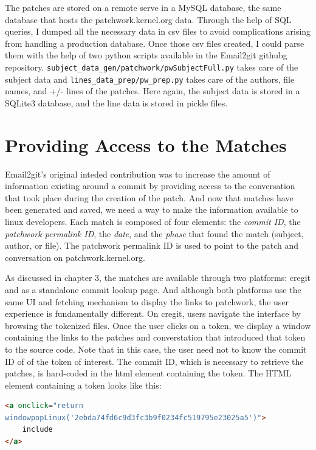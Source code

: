 The patches are stored on a remote serve in a MySQL database, the same database that hosts the patchwork.kernel.org data. Through the help of SQL queries, I dumped all the necessary data in csv files to avoid complications arising from handling a production database. Once those csv files created, I could parse them with the help of two python scripts available in the Email2git githubg repository. \texttt{subject\_data\_gen/patchwork/pwSubjectFull.py} takes care of the subject data and \texttt{lines\_data\_prep/pw\_prep.py} takes care of the authors, file names, and +/- lines of the patches. Here again, the subject data is stored in a SQLite3 database, and the line data is stored in pickle files. 







\section{Providing Access to the Matches}

Email2git's original inteded contribution was to increase the amount of information existing around a commit by providing access to the conversation that took place during the creation of the patch. And now that matches have been generated and saved, we need a way to make the information available to linux developers. Each match is composed of four elements: the \textit{commit ID}, the \textit{patchwork permalink ID}, the \textit{date}, and the \textit{phase} that found the match (subject, author, or file). The patchwork permalink ID is used to point to the patch and conversation on patchwork.kernel.org.

As discussed in chapter 3, the matches are available through two platforms: cregit and as a standalone commit lookup page. And although both platforms use the same UI and fetching mechanism to display the links to patchwork, the user experience is fundamentally different. On cregit, users navigate the interface by browsing the tokenized files. Once the user clicks on a token, we display a window containing the links to the patches and converstation that introduced that token to the source code. Note that in this case, the user need not to know the commit ID of of the token of interest. The commit ID, which is necessary to retrieve the patches, is hard-coded in the html element containing the token. The HTML element containing a token looks like this:

\begin{lstlisting}[language=HTML]
<a onclick="return 
windowpopLinux('2ebda74fd6c9d3fc3b9f0234fc519795e23025a5')">
	include
</a>
\end{lstlisting}

